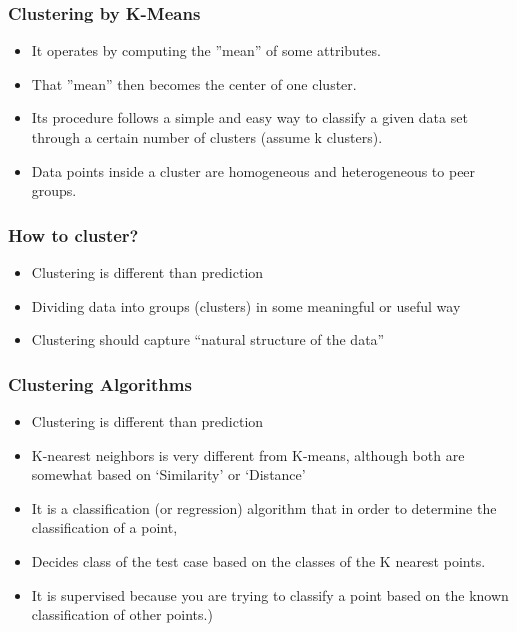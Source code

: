 \begin{frame}[fragile]\frametitle{Clustering by K-Means}
\begin{itemize}
\item It operates by computing the ''mean'' of some attributes. 
\item That ''mean'' then becomes the center of one cluster.
\item  Its procedure follows a simple and easy way to classify a given data set through a certain number of  clusters (assume k clusters). 
\item Data points inside a cluster are homogeneous and heterogeneous to peer groups.
\end{itemize}
\end{frame}
\begin{frame}[fragile]\frametitle{How to cluster?}
\begin{itemize}
\item Clustering is different than prediction
\item Dividing data into groups (clusters) in some meaningful or useful way
\item Clustering should capture ``natural structure of the data''
\end{itemize}
\end{frame}





\begin{frame}[fragile]\frametitle{Clustering Algorithms}
\begin{itemize}
\item Clustering is different than prediction
\item K-nearest neighbors is very different from K-means, although both are somewhat based on `Similarity' or `Distance'
\item It is a classification (or regression) algorithm that in order to determine the classification of a point, 
\item Decides class of the test case based on the classes of the K nearest points. 
\item It is supervised because you are trying to classify a point based on the known classification of other points.)
\end{itemize}
\end{frame}



